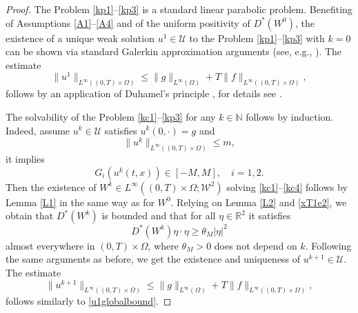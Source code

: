 \documentclass[11pt]{article}
\newcommand{\timeint}{(0,T)}
\begin{document}
\begin{proof}
The Problem \eqref{kp1}--\eqref{kp3} is a standard linear parabolic problem.
Benefiting of Assumptions \ref{A1}--\ref{A4} and of the uniform positivity of $D^*(W^0)$, the existence of a unique weak solution  $u^{1}\in \mathcal{U}$ to the Problem \eqref{kp1}--\eqref{kp3} with $k=0$ can be shown via standard Galerkin approximation arguments (see, e.g., \cite[Chapter 7, Theorem 3]{evans2010partial}). The estimate 
 \begin{equation}\label{u1globalbound}
  \|u^{1}\|_{L^{\infty}(\timeint\times\Omega)}\leq \|g\|_{L^\infty(\Omega)}+T\|f\|_{L^{\infty}(\timeint\times\Omega)},
\end{equation}
%
follows by an application of Duhamel's principle \cite[Chapter 5]{precup2012linear}, for details see \cite[Lemma 10]{EDEN2022103408}.
\par The solvability of the Problem \eqref{kc1}--\eqref{kp3} for any  $k\in \mathbb{N}$  follows by induction. Indeed, assume $u^k\in\mathcal{U}$ satisfies $u^k(0,\cdot)=g$ and
% 
\begin{equation}\label{xT1e1}
    \|u^k\|_{L^{\infty}(\timeint\times\Omega)}\leq m,
\end{equation}
%
it implies
%
\begin{equation}\label{xT1e2}
    G_i(u^k(t,x)) \in [-M,M], \quad i=1,2.
\end{equation}
Then the existence of $W^k\in L^\infty(\timeint\times\Omega;\mathcal{W}^2)$ solving \eqref{kc1}--\eqref{kc4} follows by Lemma \ref{L1} in the same way as for $W^0$.
%
Relying on Lemma \eqref{L2} and \eqref{xT1e2}, we obtain that $D^*(W^k)$ is bounded and that for all $\eta \in \mathbb{R}^2$ it satisfies
\begin{equation*}
    D^*(W^k)\eta \cdot \eta\geq\theta_M|\eta|^2
\end{equation*}
 almost everywhere in $\timeint\times\Omega$, where $\theta_M>0$ does not depend on $k$.
 Following the same arguments as before, we get the existence and uniqueness of $u^{k+1}\in\mathcal{U}$. 
 The estimate 
 \begin{equation*}
  \|u^{k+1}\|_{L^{\infty}(\timeint\times\Omega)}\leq \|g\|_{L^\infty(\Omega)}+T\|f\|_{L^{\infty}(\timeint\times\Omega)},
\end{equation*}
%
follows similarly to \eqref{u1globalbound}.

\end{proof}
\end{document}
